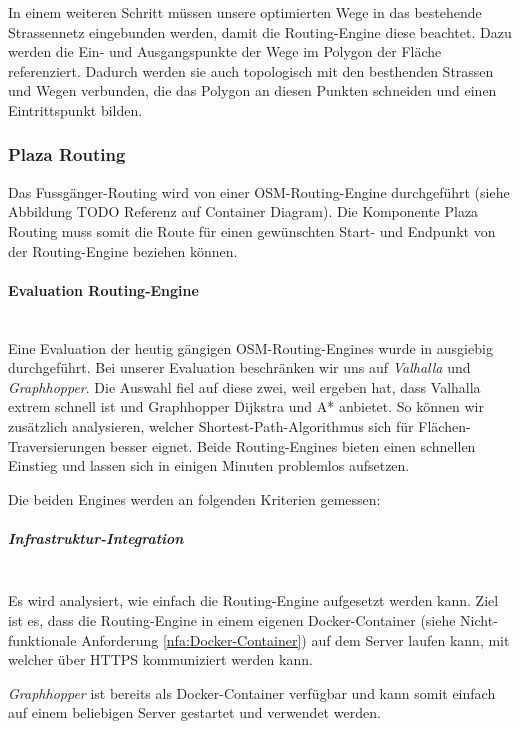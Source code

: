 In einem weiteren Schritt müssen unsere optimierten Wege in das bestehende Strassennetz eingebunden werden, damit die Routing-Engine diese beachtet. Dazu werden die Ein- und Ausgangspunkte der Wege im Polygon der Fläche referenziert. Dadurch werden sie auch topologisch mit den besthenden Strassen und Wegen verbunden, die das Polygon an diesen Punkten schneiden und einen Eintrittspunkt bilden.

\subsubsection{Plaza Routing}
\label{architektur:Plaza Routing}
Das Fussgänger-Routing wird von einer \ac{OSM}-Routing-Engine durchgeführt (siehe Abbildung TODO Referenz auf Container Diagram). Die Komponente Plaza Routing muss somit die Route für einen gewünschten Start- und Endpunkt von der Routing-Engine beziehen können.

\paragraph{Evaluation Routing-Engine}~\\
\label{architektur:Evaluation Routing-Engine}
Eine Evaluation der heutig gängigen \ac{OSM}-Routing-Engines wurde in \cite{eval_routing_engine} ausgiebig durchgeführt. Bei unserer Evaluation beschränken wir uns auf \emph{Valhalla}\cite{valhalla} und \emph{Graphhopper}\cite{graphhopper}. Die Auswahl fiel auf diese zwei, weil \cite{eval_routing_engine} ergeben hat, dass Valhalla extrem schnell ist und Graphhopper Dijkstra und A* anbietet. So können wir zusätzlich analysieren, welcher Shortest-Path-Algorithmus sich für Flächen-Traversierungen besser eignet. Beide Routing-Engines bieten einen schnellen Einstieg und lassen sich in einigen Minuten problemlos aufsetzen.

Die beiden Engines werden an folgenden Kriterien gemessen:

\subparagraph{Infrastruktur-Integration}~\\
\label{architektur:Infrastruktur-Integration}
Es wird analysiert, wie einfach die Routing-Engine aufgesetzt werden kann. Ziel ist es, dass die Routing-Engine in einem eigenen Docker-Container (siehe Nicht-funktionale Anforderung \ref{nfa:Docker-Container}) auf dem Server laufen kann, mit welcher über HTTPS kommuniziert werden kann.

\emph{Graphhopper} ist bereits als Docker-Container verfügbar und kann somit einfach auf einem beliebigen Server gestartet und verwendet werden.

